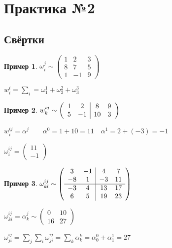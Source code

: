 \documentclass{book}
\theoremstyle{definition}
\newtheorem*{example}{Пример}
\begin{document}
 \section{Практика №2}
 \subsection{Свёртки}
\begin{example}
    $\omega^{j}_i \sim \begin{pmatrix} 1 & 2 & 3 \\ 8 & 7 & 5\\ 1 & -1 & 9 \end{pmatrix} $

    $w_i^i = \sum_i = \omega_1^1 +\omega_2^2 + \omega_3^3$
\end{example}

\begin{example}
    $w^{ij}_k \sim  \left( 
        \begin{array}{c c| c c}
            1 & 2 & 8 & 9\\ 5 & -1 & 10 & 3
        \end{array}
    \right) $

    $w_i^{ij} = \alpha^j\qquad \alpha^0 = 1 + 10 = 11\quad \alpha^1 = 2+(-3) = -1$

    $\omega^{ij}_i = \begin{pmatrix} 11\\-1 \end{pmatrix} $
\end{example}

\begin{example}
    $\omega^{ij}_{kl} \sim \left( 
        \begin{array}{c c| c c}
            3 & -1 & 4 & 7\\ -8 & 1 & -3 & 11\\ \hline -3 & 4 & 13 & 17\\ 6 & 5 & 19 & 23\\
        \end{array}
    \right) $

    $\omega_{ki}^{ij} = \alpha_k^j \sim \begin{pmatrix} 0 & 10\\ 16 & 27 \end{pmatrix} $

    $\omega^{ij}_{ji} = \sum_j\sum_i\omega^{ij}_{ji} = \sum_k \alpha_k^k = \alpha_0^0 + \alpha_1^1 = 27$
\end{example}
\end{document}

